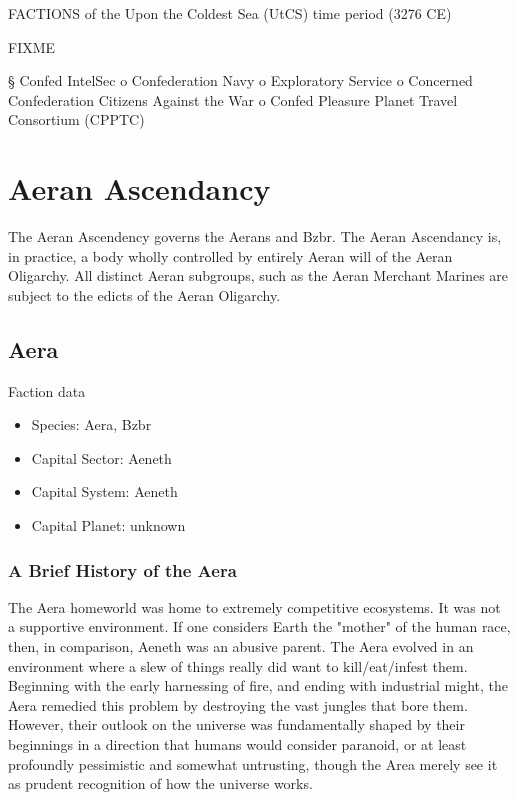 \label{appendix:Factions}
FACTIONS of the Upon the Coldest Sea (UtCS) time period (3276 CE)


FIXME

§	Confed IntelSec 
o	Confederation Navy 
o	Exploratory Service 
o	Concerned Confederation Citizens Against the War 
o	Confed Pleasure Planet Travel Consortium (CPPTC) 

\section{Aeran Ascendancy}

The Aeran Ascendency governs the Aerans and Bzbr. The Aeran Ascendancy
is, in practice, a body wholly controlled by entirely Aeran will of
the Aeran Oligarchy. All distinct Aeran subgroups, such as the Aeran
Merchant Marines are subject to the edicts of the Aeran Oligarchy.

\subsection{Aera}

Faction data
\begin{itemize}
\item Species: Aera, Bzbr
\item Capital Sector: Aeneth
\item Capital System: Aeneth
\item Capital Planet: unknown
\end{itemize}

\subsubsection{A Brief History of the Aera}

The Aera homeworld was home to extremely competitive ecosystems. It
was not a supportive environment. If one considers Earth the "mother"
of the human race, then, in comparison, Aeneth was an abusive
parent. The Aera evolved in an environment where a slew of things
really did want to kill/eat/infest them. Beginning with the early
harnessing of fire, and ending with industrial might, the Aera
remedied this problem by destroying the vast jungles that bore
them. However, their outlook on the universe was fundamentally shaped
by their beginnings in a direction that humans would consider
paranoid, or at least profoundly pessimistic and somewhat untrusting,
though the Area merely see it as prudent recognition of how the
universe works.

